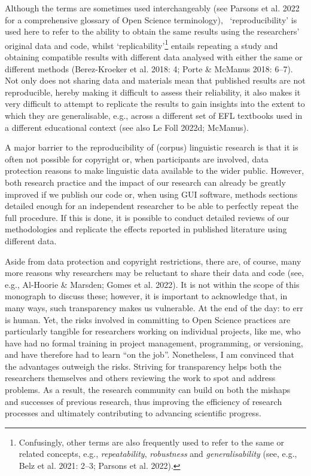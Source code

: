 \documentclass[
  letterpaper,
  DIV=11,
  numbers=noendperiod]{scrreprt}
\begin{document}
Although the terms are sometimes used interchangeably (see Parsons et
al. 2022 for a comprehensive glossary of Open Science terminology),
~`reproducibility' is used here to refer to the ability to obtain the
same results using the researchers' original data and code, whilst
`replicability'\footnote{Confusingly, other terms are also frequently
  used to refer to the same or related concepts, e.g.,
  \emph{repeatability}, \emph{robustness} and \emph{generalisability}
  (see, e.g., Belz et al. 2021: 2--3; Parsons et al. 2022).} entails
repeating a study and obtaining compatible results with different data
analysed with either the same or different methods (Berez-Kroeker et al.
2018: 4; Porte \& McManus 2018: 6--7). Not only does not sharing data
and materials mean that published results are not reproducible, hereby
making it difficult to assess their reliability, it also makes it very
difficult to attempt to replicate the results to gain insights into the
extent to which they are generalisable, e.g., across a different set of
EFL textbooks used in a different educational context (see also Le Foll
2022d; McManus).

A major barrier to the reproducibility of (corpus) linguistic research
is that it is often not possible for copyright or, when participants are
involved, data protection reasons to make linguistic data available to
the wider public. However, both research practice and the impact of our
research can already be greatly improved if we publish our code or, when
using GUI software, methods sections detailed enough for an independent
researcher to be able to perfectly repeat the full procedure. If this is
done, it is possible to conduct detailed reviews of our methodologies
and replicate the effects reported in published literature using
different data.

Aside from data protection and copyright restrictions, there are, of
course, many more reasons why researchers may be reluctant to share
their data and code (see, e.g., Al-Hoorie \& Marsden; Gomes et al.
2022). It is not within the scope of this monograph to discuss these;
however, it is important to acknowledge that, in many ways, such
transparency makes us vulnerable. At the end of the day: to err is
human. Yet, the risks involved in committing to Open Science practices
are particularly tangible for researchers working on individual
projects, like me, who have had no formal training in project
management, programming, or versioning, and have therefore had to learn
``on the job''. Nonetheless, I am convinced that the advantages outweigh
the risks. Striving for transparency helps both the researchers
themselves and others reviewing the work to spot and address problems.
As a result, the research community can build on both the mishaps and
successes of previous research, thus improving the efficiency of
research processes and ultimately contributing to advancing scientific
progress.
\end{document}
